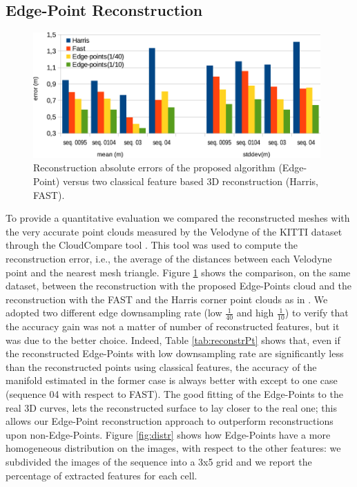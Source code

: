 \subsection{Edge-Point Reconstruction}
\label{sec:experimental-results}
\begin{figure}[t]
  \centering
  \includegraphics[width=0.98\textwidth]{./img/risultati.pdf}
  \caption{Reconstruction absolute errors of the proposed algorithm (Edge-Point) versus two classical feature based 3D reconstruction (Harris, FAST).}
   \label{tab:comp}
\end{figure}

To provide a quantitative evaluation we compared the reconstructed meshes with the very accurate point clouds measured by the Velodyne of the KITTI dataset through the CloudCompare tool \cite{CloudCompare}.
This tool was used to compute the reconstruction error, i.e., the average of the distances between each Velodyne point and the nearest mesh triangle.
Figure \ref{tab:comp} shows the comparison, on the same dataset, between the reconstruction with the proposed Edge-Points cloud and the reconstruction with the FAST and the Harris corner point clouds as in \cite{litvinov_Lhiuller14}.  
We adopted two different edge downsampling rate (low $\frac{1}{40}$ and high $\frac{1}{10}$) to verify that the accuracy gain was not a matter of number of reconstructed features, but it was due to the better choice. 
Indeed, Table \ref{tab:reconstrPt} shows that, even if the reconstructed Edge-Points with low downsampling rate are significantly less than the reconstructed points using classical features, the accuracy of the manifold estimated in the former case is always better with except to one case (sequence 04 with respect to FAST).  
The good fitting of the Edge-Points to the real 3D curves, lets the reconstructed surface to lay closer to the real one; this allows our Edge-Point reconstruction approach to outperform reconstructions upon non-Edge-Points.
Figure \ref{fig:distr} shows how Edge-Points have a more homogeneous distribution on the images, with respect to the other features: we subdivided the images of the sequence into a 3x5 grid and we report the percentage of extracted features for each cell.


